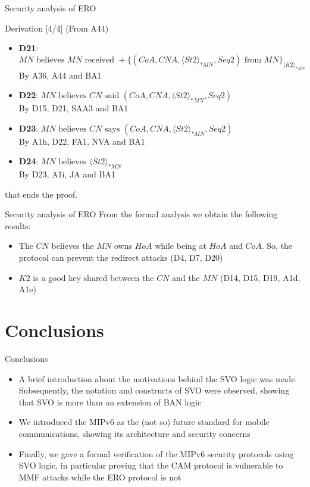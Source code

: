 \documentclass[10pt]{beamer}
\newcommand{\xtext}[1]{\text{ #1 }}
\begin{document}
\begin{frame}{Security analysis of ERO}
	\begin{block}{Derivation [4/4]}
		(From A44)
		\begin{itemize}
			\item \textbf{D21}: {\small $MN \xtext{believes} MN \xtext{received} {+}\{(CoA, CNA, \langle St2\rangle_{*MN}, Seq2) \xtext{from} MN\}_{\langle K2\rangle_{*MN}}$ \\ \hspace{1.7cm} By A36, A44 and BA1}
			\item \textbf{D22}: {\small $MN \xtext{believes} CN \xtext{said} (CoA, CNA, \langle St2\rangle_{*MN}, Seq2)$ \\ \hspace{1.7cm} By D15, D21, SAA3 and BA1}
			\item \textbf{D23}: {\small $MN \xtext{believes} CN \xtext{says} (CoA, CNA, \langle St2\rangle_{*MN}, Seq2)$ \\ \hspace{1.7cm} By A1h, D22, FA1, NVA and BA1}
			\item \textbf{D24}: {\small $MN \xtext{believes} \langle St2\rangle_{*MN}$ \\ \hspace{1.7cm} By D23, A1i, JA and BA1}
		\end{itemize}
		\par that ends the proof.
	\end{block}
\end{frame}
\begin{frame}{Security analysis of ERO}
	From the formal analysis we obtain the following results:
	\begin{itemize}
		\item The $CN$ believes the $MN$ owns $HoA$ while being at $HoA$ and $CoA$. So, the protocol \alert{can prevent the redirect attacks} (D4, D7, D20)
		\item $K2$ is a good key shared between the $CN$ and the $MN$ (D14, D15, D19, A1d, A1e)
	\end{itemize}
\end{frame}
\section{Conclusions}
\begin{frame}{Conclusions}
   \begin{itemize}
	   \item A brief introduction about the motivations behind the SVO logic was made. Subsequently, the notation and constructs of SVO were observed, showing that SVO is more than an extension of BAN logic
	   \item We introduced the MIPv6 as the (not so) future standard for mobile communications, showing its architecture and security concerns
	   \item Finally, we gave a formal verification of the MIPv6 security protocols using SVO logic, in particular proving that the CAM protocol is vulnerable to MMF attacks while the ERO protocol is not
   \end{itemize}
\end{frame}
\end{document}
